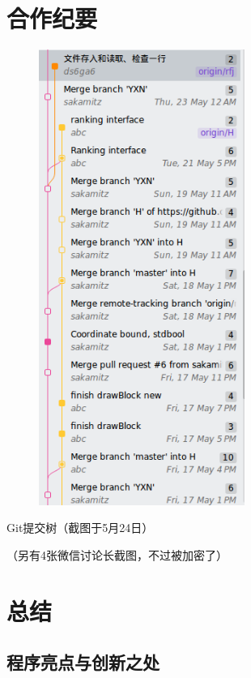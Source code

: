 \documentclass{style/ucasproposal}
\begin{document}
\section{合作纪要}
\begin{center}
\begin{figure}[H]
\center
    \includegraphics[width=0.6\textwidth]{./img//collaboration/tree.png}
\end{figure}
Git提交树（截图于5月24日）

（另有4张微信讨论长截图，不过被加密了）
\end{center}

\section{总结}
\subsection{程序亮点与创新之处}
\end{document}
